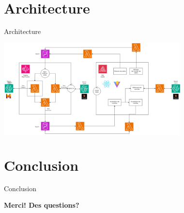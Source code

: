 \documentclass{beamer}
\begin{document}
\section{Architecture}
\begin{frame}{Architecture}
	\begin{center}
	\includegraphics[height=5cm]{archi_AWS.drawio.png}
	\end{center}
\end{frame}



\section{Conclusion}
\begin{frame}{Conclusion}
	\begin{center}
	\textbf{Merci! Des questions?}
	\end{center}
\end{frame}
\end{document}
